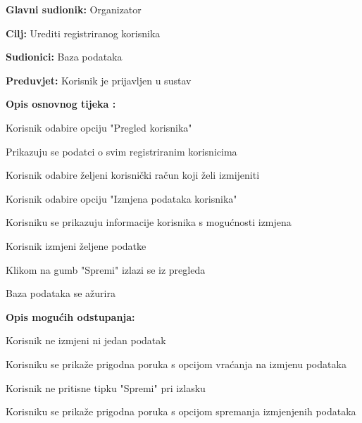 					\noindent {}
					\begin{packed_item}
						
						\item \textbf{Glavni sudionik: } Organizator
						\item  \textbf{Cilj:} Urediti registriranog korisnika
						\item  \textbf{Sudionici:} Baza podataka
						\item  \textbf{Preduvjet:} Korisnik je prijavljen u sustav
						\item  \textbf{Opis osnovnog tijeka :}
						
						\item[] \begin{packed_enum}
							
							\item Korisnik odabire opciju "Pregled korisnika"
							\item Prikazuju se podatci o svim registriranim korisnicima
							\item Korisnik odabire željeni korisnički račun koji želi izmijeniti
							\item Korisnik odabire opciju "Izmjena podataka korisnika"
							\item Korisniku se prikazuju informacije korisnika s mogućnosti izmjena
							\item Korisnik izmjeni željene podatke
							\item Klikom na gumb "Spremi" izlazi se iz pregleda
							\item Baza podataka se ažurira
						\end{packed_enum}
						
						\item  \textbf{Opis mogućih odstupanja:}
						
						\item[] \begin{packed_item}
							
							\item[2.a] Korisnik ne izmjeni ni jedan podatak
							\item[] \begin{packed_enum}
								
								\item Korisniku se prikaže prigodna poruka s opcijom vraćanja na izmjenu podataka
								
							\end{packed_enum}
							\item[4.b] Korisnik ne pritisne tipku "Spremi" pri izlasku
							\item[] \begin{packed_enum}
								
								\item Korisniku se prikaže prigodna poruka s opcijom spremanja izmjenjenih podataka
								
							\end{packed_enum}
						\end{packed_item}
					\end{packed_item}
					
